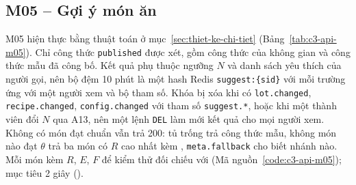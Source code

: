 \subsection{M05 – Gợi ý món ăn}\label{sssec:api-m05}

M05 hiện thực  bằng thuật toán ở mục~\ref{sec:thiet-ke-chi-tiet} (Bảng~\ref{tab:c3-api-m05}). Chỉ công thức \texttt{published} được xét, gồm công thức của không gian và công thức mẫu đã công bố. Kết quả phụ thuộc ngưỡng $N$ và danh sách yêu thích của người gọi, nên bộ đệm 10 phút là một hash Redis \texttt{suggest:\{sid\}} với mỗi trường ứng với một người xem và bộ tham số. Khóa bị xóa khi có \texttt{lot.changed}, \texttt{recipe.changed}, \texttt{config.changed} với tham số \texttt{suggest.*}, hoặc khi một thành viên đổi $N$ qua A13, nên một lệnh \texttt{DEL} làm mới kết quả cho mọi người xem. Không có món đạt chuẩn vẫn trả 200: tủ trống trả công thức mẫu, không món nào đạt $\theta$ trả ba món có $R$ cao nhất kèm , \texttt{meta.fallback} cho biết nhánh nào. Mỗi món kèm $R$, $E$, $F$ để kiểm thử đối chiếu với  (Mã nguồn~\ref{code:c3-api-m05}); mục tiêu 2 giây ().

